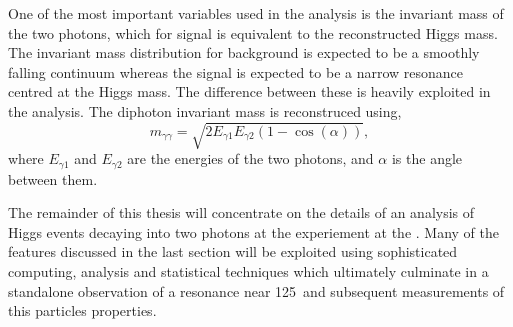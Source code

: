 One of the most important variables used in the analysis is the invariant mass of the two photons, which for signal is equivalent to the reconstructed Higgs mass. The invariant mass distribution for background is expected to be a smoothly falling continuum whereas the signal is expected to be a narrow resonance centred at the Higgs mass. The difference between these is heavily exploited in the analysis. The diphoton invariant mass is reconstruced using,
\begin{equation}
	m_{\gamma\gamma} = \sqrt{2E_{\gamma1}E_{\gamma2}(1-\cos(\alpha))},
\label{eq:invmass}
\end{equation}
where $E_{\gamma1}$ and $E_{\gamma2}$ are the energies of the two photons, and $\alpha$ is the angle between them.

The remainder of this thesis will concentrate on the details of an analysis of Higgs events decaying into two photons at the \CMS experiement at the \LHC. Many of the features discussed in the last section will be exploited using sophisticated computing, analysis and statistical techniques which ultimately culminate in a standalone observation of a resonance near 125~\GeV and subsequent measurements of this particles properties.

